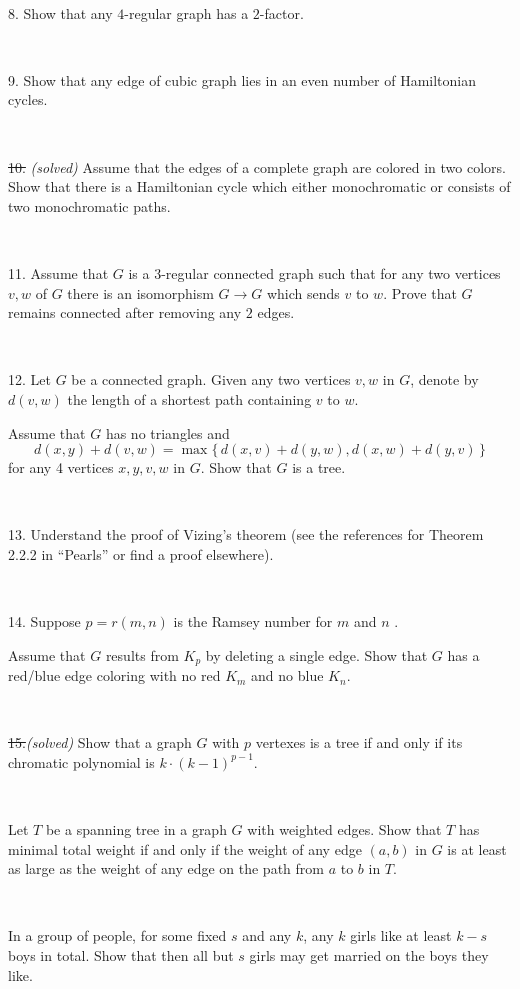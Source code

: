 \documentclass[oneside,a4paper]{article}
\begin{document}
\ 


\noindent %
{8.} %
Show that any $4$-regular graph has a $2$-factor.

\ 


\noindent %
{9.} %
Show that any edge of cubic graph lies in an even number of Hamiltonian cycles.


\ 

\noindent \sout
{10.} \textit{(solved)} 
Assume that the edges of a complete graph are colored in two colors.
Show that there is a Hamiltonian cycle which either monochromatic or consists of two monochromatic paths.

\ 

\noindent %
{11.}  %
Assume that $G$ is a $3$-regular connected graph such that 
for any two vertices $v,w$ of $G$ there is an isomorphism
$G\to G$ which sends $v$ to $w$.
Prove that $G$ remains connected after removing any $2$ edges.

\ 


\noindent %
{12.} %
Let $G$ be a connected graph.
Given any two vertices $v,w$ in $G$, denote by $d(v,w)$ the length of a shortest path containing $v$ to $w$. 

Assume that $G$ has no triangles and
\[d(x,y)+d(v,w)=\max\{\,d(x,v)+d(y,w),d(x,w)+d(y,v)\,\}\]
for any 4 vertices $x,y,v,w$ in $G$.
Show that $G$ is a tree.

\ 

\noindent %
{13.} %
Understand the proof of Vizing's theorem (see the references for Theorem 2.2.2 in ``Pearls'' or find a proof elsewhere).

\ 

\noindent %
{14.} %
Suppose $p=r(m,n)$ is the Ramsey number for $m$ and $n$%
.

Assume that $G$ results from $K_p$ by deleting a single edge.
Show that $G$ has a red/blue edge coloring with no red
$K_m$ and no blue $K_n$.

\ 

\noindent \sout{15.}\textit{(solved)} Show that a graph $G$ with $p$ vertexes is a tree if and only if
its chromatic polynomial is $k\cdot(k-1)^{p-1}$.

\ 

 Let $T$ be a spanning tree in a graph $G$ with weighted edges.
Show that $T$ has minimal total weight if and only if the weight of any edge $(a,b)$ in $G$ is at least as large as the weight of any edge on the path from $a$ to $b$ in $T$. 

\ 

 In a group of people, for some fixed $s$ and any $k$,
any $k$ girls like at least $k-s$ boys in total.
Show that then all but $s$ girls may get married on the boys they like.
\end{document}
